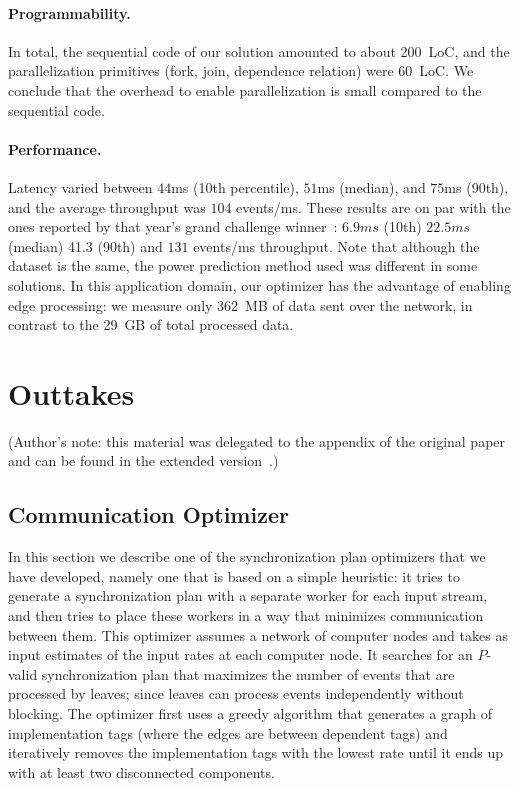 \paragraph{Programmability.}
In total, the sequential code of our solution amounted to about 200~LoC, and the parallelization primitives (fork, join,
dependence relation) were 60~LoC.  We conclude that the overhead to enable
parallelization is small compared to the sequential code.

\paragraph{Performance.}
Latency varied between $44$ms (10th percentile), $51$ms (median), and
$75$ms (90th), and the average throughput was $104$
events/ms. These results are on par with the ones reported
by that year's grand challenge winner~\cite{mutschler2014predictive}:
$6.9ms$ (10th) $22.5ms$ (median) 41.3 (90th) and $131$ events/ms
throughput.
Note that although the dataset is the same,
the power prediction method used was different in some solutions.  In
this application domain, our optimizer has the advantage of enabling
edge processing: we measure only 362~MB of data sent over the network,
in contrast to the 29~GB of total processed data.

\section{Outtakes}

(Author's note: this material was delegated to the appendix of the original paper and can be found in the extended version~.)

\subsection{Communication Optimizer}
\label{dgs:appendix:optimizer}

In this section we describe one of the synchronization plan optimizers that we have developed, namely one that is based on a simple
heuristic: it tries to generate a synchronization plan with a
separate worker for each input stream, and then tries to place these
workers in a way that minimizes communication between them.
This optimizer assumes a network of computer nodes and takes as input
estimates of the input rates at each computer node. It searches for an
$P$-valid synchronization plan that maximizes the number of events
that are processed by leaves; since leaves can process events
independently without blocking. The optimizer first uses a greedy
algorithm that generates a graph of implementation tags (where the
edges are between dependent tags) and iteratively removes the implementation
tags with the lowest rate until it ends up with at least two
disconnected components.

